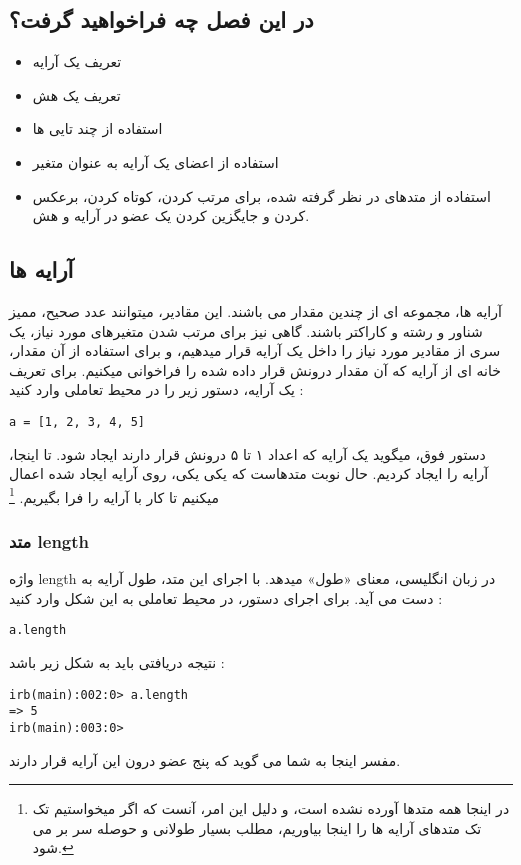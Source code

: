 \documentclass[11pt]{article}
\begin{document}
\subsection{در این فصل چه فراخواهید گرفت؟}
\begin{itemize}
\item تعریف یک آرایه
\item تعریف یک هش
\item استفاده از چند تایی ها
\item استفاده از اعضای یک آرایه به عنوان متغیر
\item استفاده از متدهای در نظر گرفته شده، برای مرتب کردن، کوتاه کردن، برعکس کردن و جایگزین کردن یک عضو در آرایه و هش.
\end{itemize}
\subsection{آرایه ها}
آرایه ها، مجموعه ای از چندین مقدار می باشند. این مقادیر، میتوانند عدد صحیح، ممیز شناور و رشته و کاراکتر باشند. گاهی نیز برای مرتب شدن متغیرهای مورد نیاز، یک سری از مقادیر مورد نیاز را داخل یک آرایه قرار میدهیم، و برای استفاده از آن مقدار، خانه ای از آرایه که آن مقدار درونش قرار داده شده را فراخوانی میکنیم. برای تعریف یک آرایه، دستور زیر را در محیط تعاملی وارد کنید :
\begin{latin}
\begin{verbatim}
a = [1, 2, 3, 4, 5]
\end{verbatim}
\end{latin}
دستور فوق، میگوید یک آرایه که اعداد ۱ تا ۵ درونش قرار دارند ایجاد شود. تا اینجا، آرایه را ایجاد کردیم. حال نوبت متدهاست که یکی یکی، روی آرایه ایجاد شده اعمال میکنیم تا کار با آرایه را فرا بگیریم.
\footnote{در اینجا همه متدها آورده نشده است، و دلیل این امر، آنست که اگر میخواستیم تک تک متدهای آرایه ها را اینجا بیاوریم، مطلب بسیار طولانی و حوصله سر بر می شود.}
\subsubsection{متد length}
واژه length در زبان انگلیسی، معنای «طول» میدهد. با اجرای این متد، طول آرایه به دست می آید. برای اجرای دستور، در محیط تعاملی به این شکل وارد کنید :
\begin{latin}
\begin{verbatim}
a.length
\end{verbatim}
\end{latin}
نتیجه دریافتی باید به شکل زیر باشد :
\begin{latin}
\begin{verbatim}
irb(main):002:0> a.length
=> 5
irb(main):003:0>
\end{verbatim}
\end{latin}
مفسر اینجا به شما می گوید که پنج عضو درون این آرایه قرار دارند. 
\end{document}
